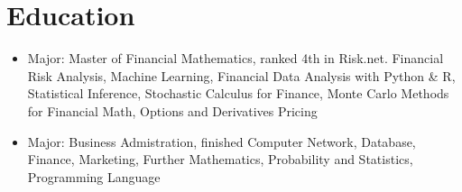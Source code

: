 \documentclass{resume}
\newcommand{\en}[1]{#1}
\newcommand{\zh}[1]{}
\begin{document}
\name{\en{Qinyang Huang}\zh{黄沁洋}}

\section{\en{Education}\zh{教育经历}}
\en{}
\vspace{2 mm}
\zh{\datedsubsection{\textbf{\href{https://ncsu.edu}{北卡州立}}, 本科}{2023/09 -- 2025/01}}
\begin{itemize}
      \item \en{Major: Master of Financial Mathematics, ranked 4th in Risk.net.  
      Financial Risk Analysis, Machine Learning, Financial Data Analysis with Python \& R, Statistical Inference, Stochastic Calculus for 
      Finance, Monte Carlo Methods for Financial Math, Options and Derivatives Pricing}
            \zh{工商管理，完成计算机网络、数据库、金融、高等数学}
\end{itemize}
\vspace{2 mm}

\en{}
\vspace{2 mm}
\zh{\datedsubsection{\textbf{\href{http://www.usst.edu.cn/main.htm}{上海理工大学}}, 本科}{2018/09 -- 2022/06}}
\begin{itemize}
      \item \en{Major: Business Admistration, finished Computer Network, Database, Finance, Marketing, Further Mathematics, Probability and Statistics, Programming Language}
            \zh{工商管理，完成计算机网络、数据库、金融、高等数学}
\end{itemize}
\vspace{2 mm}
\end{document}
